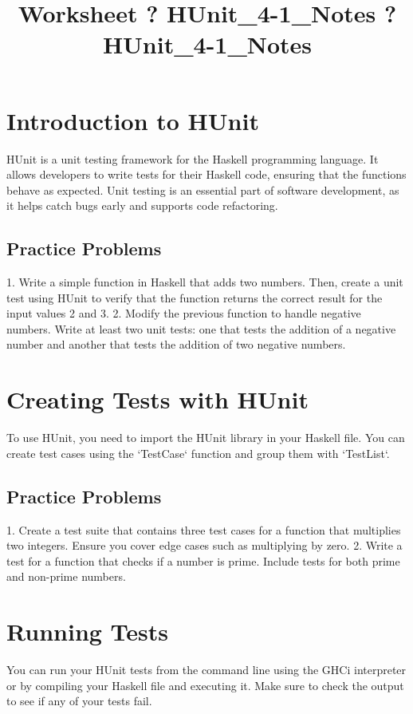 \documentclass{article}
\title{Worksheet ? HUnit\_4-1\_Notes ? HUnit\_4-1\_Notes}
\author{}
\date{}
\begin{document}
\maketitle

\section*{Introduction to HUnit}
HUnit is a unit testing framework for the Haskell programming language. It allows developers to write tests for their Haskell code, ensuring that the functions behave as expected. Unit testing is an essential part of software development, as it helps catch bugs early and supports code refactoring.

\subsection*{Practice Problems}
1. Write a simple function in Haskell that adds two numbers. Then, create a unit test using HUnit to verify that the function returns the correct result for the input values 2 and 3.
2. Modify the previous function to handle negative numbers. Write at least two unit tests: one that tests the addition of a negative number and another that tests the addition of two negative numbers.

\section*{Creating Tests with HUnit}
To use HUnit, you need to import the HUnit library in your Haskell file. You can create test cases using the `TestCase` function and group them with `TestList`.

\subsection*{Practice Problems}
1. Create a test suite that contains three test cases for a function that multiplies two integers. Ensure you cover edge cases such as multiplying by zero.
2. Write a test for a function that checks if a number is prime. Include tests for both prime and non-prime numbers.

\section*{Running Tests}
You can run your HUnit tests from the command line using the GHCi interpreter or by compiling your Haskell file and executing it. Make sure to check the output to see if any of your tests fail.
\end{document}
